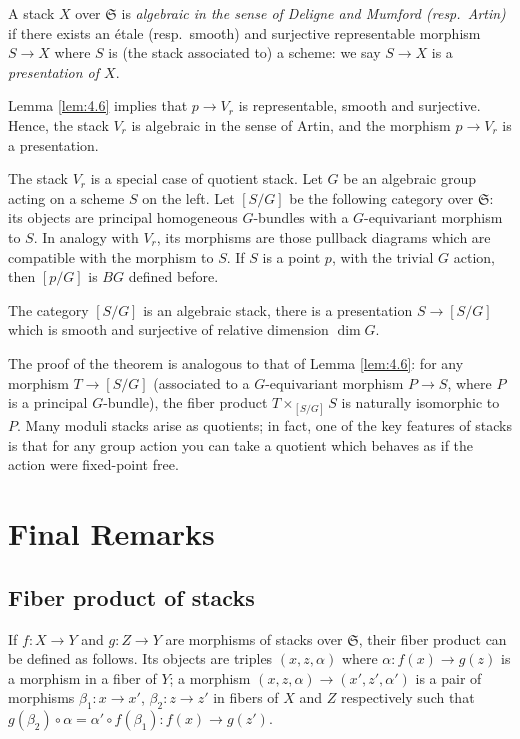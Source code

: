 \documentclass[12pt]{memoir}
\begin{document}
\begin{Def}\label{def:5.2}
A stack $X$ over $\mathfrak{S}$ is \emph{algebraic in the sense of Deligne and Mumford (resp.\ Artin)} if there exists an \'etale (resp.\ smooth) and surjective representable morphism $S \to X$ where $S$ is (the stack associated to) a scheme: we say $S \to X$ is a \emph{presentation of $X$}.
\end{Def}

Lemma \ref{lem:4.6} implies that $p \to V_r$ is representable, smooth and surjective. Hence, the stack $V_r$ is algebraic in the sense of Artin, and the morphism $p \to V_r$ is a presentation.

The stack $V_r$ is a special case of quotient stack. Let $G$ be an algebraic group acting on a scheme $S$ on the left. Let $[S/G]$ be the following category over $\mathfrak{S}$: its objects are principal homogeneous $G$-bundles with a $G$-equivariant morphism to $S$. In analogy with $V_r$, its morphisms are those pullback diagrams which are compatible with the morphism to $S$. If $S$ is a point $p$, with the trivial $G$ action, then $[p/G]$ is $BG$ defined before.

\begin{Th}\label{thm:5.3}
The category $[S/G]$ is an algebraic stack, there is a presentation $S \to [S/G]$ which is smooth and surjective of relative dimension $\dim G$.
\end{Th}

The proof of the theorem is analogous to that of Lemma \ref{lem:4.6}: for any morphism $T \to [S/G]$ (associated to a $G$-equivariant morphism $P \to S$, where $P$ is a principal $G$-bundle), the fiber product $T \times_{[S/G]} S$ is naturally isomorphic to $P$. Many moduli stacks arise as quotients; in fact, one of the key features of stacks is that for any group action you can take a quotient which behaves as if the action were fixed-point free.

\section{Final Remarks}

\subsection{Fiber product of stacks}

\begin{Def}\label{def:6.1}
If $f\colon X \to Y$ and $g\colon Z \to Y$ are morphisms of stacks over $\mathfrak{S}$, their fiber product can be defined as follows. Its objects are triples $(x, z, \alpha)$ where $\alpha\colon f(x) \to g(z)$ is a morphism in a fiber of $Y$; a morphism $(x, z, \alpha) \to (x', z', \alpha')$ is a pair of morphisms $\beta_1\colon x \to x'$, $\beta_2\colon z \to z'$ in fibers of $X$ and $Z$ respectively such that $g(\beta_2) \circ \alpha = \alpha' \circ f(\beta_1)\colon f(x) \to g(z')$.
\end{Def}
\end{document}
